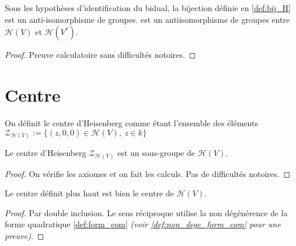 \begin{definition}
    \label{prop:antiisoH}
    \leanok 

    Sous les hypothèses d'identification du bidual, la bijection définie en \ref{def:bij_H} est un anti-isomorphisme de groupes.
    est un antiisomorphisme de groupes entre $\mathcal{H}(V)$ et $\mathcal{H}(V^*)$.
    \begin{proof}
        \leanok
        Preuve calculatoire sans difficultés notoires.
    \end{proof}
\end{definition}

\section{Centre}

\begin{definition}
    \label{def:center_H}
    \leanok 

    On définit le centre d'Heisenberg comme étant l'ensemble des éléments
    $\mathcal{Z}_{\mathcal{H}(V)}:=\{(z,0,0)\in\mathcal{H}(V),\ z\in k\}$
\end{definition}

\begin{proposition}
    \label{prop:center_H_subgroup}
    \leanok

    Le centre d'Heisenberg $\mathcal{Z}_{\mathcal{H}(V)}$ est un sous-groupe
    de $\mathcal{H}(V)$.
    \begin{proof}
        \leanok
        On vérifie les axiomes et on fait les calculs. Pas de difficultés notoires.
    \end{proof}
\end{proposition}

\begin{proposition}
    \label{prop:center_H_is_center}
    \leanok

    Le centre définit plus haut est bien le centre de $\mathcal{H}(V)$.
    \begin{proof}
        \leanok
        Par double inclusion. Le sens réciproque utilise la non dégénérence de la forme
        quadratique \ref{def:form_com} \textit{(voir \ref{def:non_dege_form_com} pour une preuve)}.
    \end{proof}
\end{proposition}

